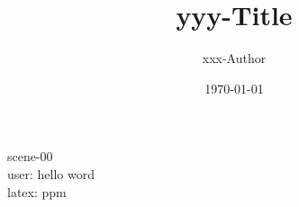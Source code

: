 \documentclass{article}
\title{yyy-Title}
\author{xxx-Author}
\date{\today}
\begin{document}
\maketitle
scene-00\\
user: hello word\\
latex: ppm
\end{document}
